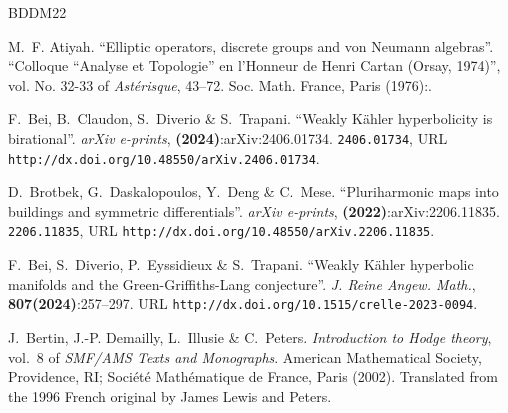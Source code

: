 \documentclass[11pt,a4paper,english]{smfart}
\theoremstyle{plain}
\theoremstyle{definition}
\theoremstyle{plain}
\begin{document}
   

\begin{thebibliography}{BDDM22}
	\newcommand{\enquote}[1]{``#1''}
	\providecommand{\url}[1]{\texttt{#1}}
	\providecommand{\urlprefix}{URL }
	\providecommand{\bibinfo}[2]{#2}
	\providecommand{\eprint}[2][]{\url{#2}}
	
	\bibinfo{author}{M.~F. Atiyah}.
	\newblock \enquote{\bibinfo{title}{Elliptic operators, discrete groups and von
			{N}eumann algebras}}.
	\newblock \enquote{\bibinfo{booktitle}{Colloque ``{A}nalyse et {T}opologie'' en
			l'{H}onneur de {H}enri {C}artan ({O}rsay, 1974)}}, vol. \bibinfo{volume}{No.
		32-33} of \emph{\bibinfo{series}{Ast\'{e}risque}}, \bibinfo{pages}{43--72}.
	\bibinfo{publisher}{Soc. Math. France, Paris}
	(\bibinfo{year}{1976}):\hspace{0pt}.
	
	\bibinfo{author}{F.~{Bei}}, \bibinfo{author}{B.~{Claudon}},
	\bibinfo{author}{S.~{Diverio}} \& \bibinfo{author}{S.~{Trapani}}.
	\newblock \enquote{\bibinfo{title}{{Weakly K{\"a}hler hyperbolicity is
				birational}}}.
	\newblock \emph{\bibinfo{journal}{arXiv e-prints}},
	\textbf{(\bibinfo{year}{2024})}:\bibinfo{eid}{arXiv:2406.01734}.
	\newblock \eprint{2406.01734},
	\urlprefix\url{http://dx.doi.org/10.48550/arXiv.2406.01734}.
	
	\bibinfo{author}{D.~{Brotbek}}, \bibinfo{author}{G.~{Daskalopoulos}},
	\bibinfo{author}{Y.~{Deng}} \& \bibinfo{author}{C.~{Mese}}.
	\newblock \enquote{\bibinfo{title}{{Pluriharmonic maps into buildings and
				symmetric differentials}}}.
	\newblock \emph{\bibinfo{journal}{arXiv e-prints}},
	\textbf{(\bibinfo{year}{2022})}:\bibinfo{eid}{arXiv:2206.11835}.
	\newblock \eprint{2206.11835},
	\urlprefix\url{http://dx.doi.org/10.48550/arXiv.2206.11835}.
	
	\bibinfo{author}{F.~Bei}, \bibinfo{author}{S.~Diverio},
	\bibinfo{author}{P.~Eyssidieux} \& \bibinfo{author}{S.~Trapani}.
	\newblock \enquote{\bibinfo{title}{Weakly {K}\"{a}hler hyperbolic manifolds and
			the {G}reen-{G}riffiths-{L}ang conjecture}}.
	\newblock \emph{\bibinfo{journal}{J. Reine Angew. Math.}},
	\textbf{\bibinfo{volume}{807}(\bibinfo{year}{2024})}:\bibinfo{pages}{257--297}.
	\newblock \urlprefix\url{http://dx.doi.org/10.1515/crelle-2023-0094}.
	
	\bibinfo{author}{J.~Bertin}, \bibinfo{author}{J.-P. Demailly},
	\bibinfo{author}{L.~Illusie} \& \bibinfo{author}{C.~Peters}.
	\newblock \emph{\bibinfo{title}{Introduction to {H}odge theory}},
	vol.~\bibinfo{volume}{8} of \emph{\bibinfo{series}{SMF/AMS Texts and
			Monographs}}.
	\newblock \bibinfo{publisher}{American Mathematical Society, Providence, RI;
		Soci\'{e}t\'{e} Math\'{e}matique de France, Paris} (\bibinfo{year}{2002}).
	\newblock \bibinfo{note}{Translated from the 1996 French original by James
		Lewis and Peters}.
	

\end{thebibliography}
\end{document}
